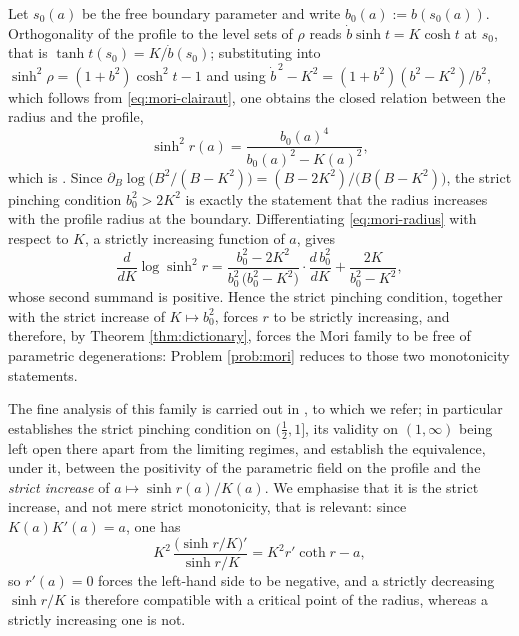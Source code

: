 \documentclass[11pt,a4paper]{amsart}
\theoremstyle{plain}
\theoremstyle{definition}
\begin{document}
Let $s_0(a)$ be the free boundary parameter and write $b_0(a):=b(s_0(a))$. Orthogonality of the profile to the level sets of $\rho$ reads $\dot b\sinh t=K\cosh t$ at $s_0$, that is $\tanh t(s_0)=K/\dot b(s_0)$; substituting into $\sinh^2\rho=(1+b^2)\cosh^2t-1$ and using $\dot b^{\,2}-K^2=(1+b^2)(b^2-K^2)/b^2$, which follows from \eqref{eq:mori-clairaut}, one obtains the closed relation between the radius and the profile,
\begin{equation}\label{eq:mori-radius}
\sinh^2 r(a)=\frac{b_0(a)^4}{b_0(a)^2-K(a)^2} ,
\end{equation}
which is \cite[Prop. 8.10]{P1}. Since $\partial_B\log\bigl(B^2/(B-K^2)\bigr)=(B-2K^2)/\bigl(B(B-K^2)\bigr)$, the strict pinching condition $b_0^2>2K^2$ is exactly the statement that the radius increases with the profile radius at the boundary. Differentiating \eqref{eq:mori-radius} with respect to $K$, a strictly increasing function of $a$, gives
\begin{equation}\label{eq:mori-reduction}
\frac{d}{dK}\log\sinh^2 r=\frac{b_0^2-2K^2}{b_0^2\,\bigl(b_0^2-K^2\bigr)}\cdot\frac{d\,b_0^2}{dK}+\frac{2K}{b_0^2-K^2},
\end{equation}
whose second summand is positive. Hence the strict pinching condition, together with the strict increase of $K\mapsto b_0^2$, forces $r$ to be strictly increasing, and therefore, by Theorem \ref{thm:dictionary}, forces the Mori family to be free of parametric degenerations: Problem \ref{prob:mori} reduces to those two monotonicity statements.

The fine analysis of this family is carried out in \cite{P1}, to which we refer; in particular \cite[Thm. 8.17]{P1} establishes the strict pinching condition on $(\tfrac12,1]$, its validity on $(1,\infty)$ being left open there apart from the limiting regimes, and \cite[Thm. 11.5 and Thm. 11.6]{P1} establish the equivalence, under it, between the positivity of the parametric field on the profile and the \emph{strict increase} of $a\mapsto\sinh r(a)/K(a)$. We emphasise that it is the strict increase, and not mere strict monotonicity, that is relevant: since $K(a)K'(a)=a$, one has
\begin{equation}\label{eq:H-log}
K^2\,\frac{\bigl(\sinh r/K\bigr)'}{\sinh r/K}=K^2r'\coth r-a ,
\end{equation}
so $r'(a)=0$ forces the left-hand side to be negative, and a strictly decreasing $\sinh r/K$ is therefore compatible with a critical point of the radius, whereas a strictly increasing one is not.
\end{document}
